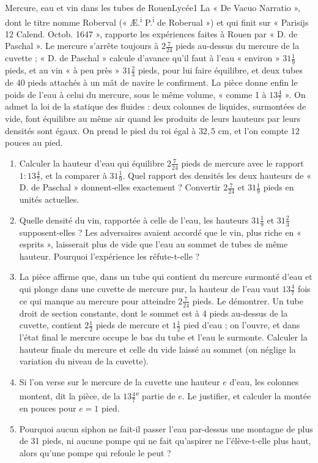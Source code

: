 \documentclass[11pt,a4paper]{article}
\begin{document}
\begin{exercice}{Mercure, eau et vin dans les tubes de Rouen}{Lycée}{1}
La « De Vacuo Narratio », dont le titre nomme Roberval
(« Æ.\textsuperscript{i} P.\textsuperscript{i} de Roberual ») et qui finit sur
« Parisijs 12 Calend. Octob. 1647 », rapporte les expériences faites à Rouen par
« D. de Paschal ». Le mercure s'arrête toujours à $2\frac{7}{24}$ pieds au-dessus
du mercure de la cuvette ; « D. de Paschal » calcule d'avance qu'il faut à l'eau
« environ » $31\frac19$ pieds, et au vin « à peu près » $31\frac23$ pieds, pour lui
faire équilibre, et deux tubes de 40 pieds attachés à un mât de navire le
confirment. La pièce donne enfin le poids de l'eau à celui du mercure, sous le
même volume, « comme 1 à $13\frac47$ ». On admet la loi de la statique des
fluides : deux colonnes de liquides, surmontées de vide, font équilibre au même
air quand les produits de leurs hauteurs par leurs densités sont égaux. On prend
le pied du roi égal à $32{,}5$ cm, et l'on compte 12 pouces au pied.


\begin{enumerate}
\item Calculer la hauteur d'eau qui équilibre $2\frac{7}{24}$ pieds de mercure
  avec le rapport $1 : 13\frac47$, et la comparer à $31\frac19$. Quel rapport des
  densités les deux hauteurs de « D. de Paschal » donnent-elles exactement ?
  Convertir $2\frac{7}{24}$ et $31\frac19$ pieds en unités actuelles.
\item Quelle densité du vin, rapportée à celle de l'eau, les hauteurs $31\frac19$
  et $31\frac23$ supposent-elles ? Les adversaires avaient accordé que le vin,
  plus riche en « esprits », laisserait plus de vide que l'eau au sommet de
  tubes de même hauteur. Pourquoi l'expérience les réfute-t-elle ?
\item La pièce affirme que, dans un tube qui contient du mercure surmonté d'eau
  et qui plonge dans une cuvette de mercure pur, la hauteur de l'eau vaut
  $13\frac47$ fois ce qui manque au mercure pour atteindre $2\frac{7}{24}$ pieds.
  Le démontrer. Un tube droit de section constante, dont le sommet est à 4 pieds
  au-dessus de la cuvette, contient $2\frac12$ pieds de mercure et $1\frac12$ pied
  d'eau ; on l'ouvre, et dans l'état final le mercure occupe le bas du tube et
  l'eau le surmonte. Calculer la hauteur finale du mercure et celle du vide laissé
  au sommet (on néglige la variation du niveau de la cuvette).
\item Si l'on verse sur le mercure de la cuvette une hauteur $e$ d'eau, les
  colonnes montent, dit la pièce, de la $13\frac47$\textsuperscript{e} partie de
  $e$. Le justifier, et calculer la montée en pouces pour $e = 1$ pied.
\item Pourquoi aucun siphon ne fait-il passer l'eau par-dessus une montagne de
  plus de 31 pieds, ni aucune pompe qui ne fait qu'aspirer ne l'élève-t-elle plus
  haut, alors qu'une pompe qui refoule le peut ?
\end{enumerate}
\end{exercice}
\end{document}
